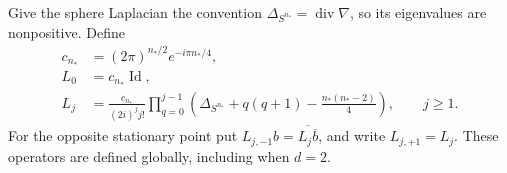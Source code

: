 Give the sphere Laplacian the convention
$\Delta_{S^{n_*}}=\operatorname{div}\nabla$, so its eigenvalues are
nonpositive.  Define
\begin{equation}\label{osc:L-operators}
 \begin{split}
 c_{n_*}&=(2\pi)^{n_*/2}e^{-i\pi n_*/4},\\
 L_0&=c_{n_*}\operatorname{Id},\\
 L_j&=\frac{c_{n_*}}{(2i)^j j!}
   \prod_{q=0}^{j-1}
   \left(\Delta_{S^{n_*}}+q(q+1)
                    -\frac{n_*(n_*-2)}4\right),\qquad j\ge1.
 \end{split}
\end{equation}
For the opposite stationary point put
$L_{j,-1}b=\overline{L_j\overline b}$, and write $L_{j,+1}=L_j$.
These operators are defined globally, including when $d=2$.

